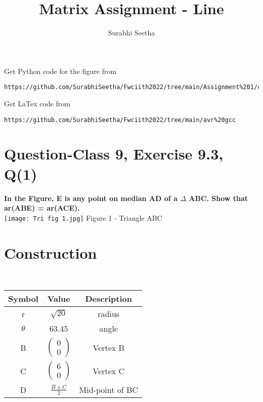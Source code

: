 \documentclass[journal,12pt,twocolumn]{IEEEtran}
\begin{document}
\makeatother
\let\StandardTheFigure\thefigure
\let\vec\mathbf
\renewcommand{\thefigure}{\theproblem}
\def\putbox#1#2#3{\makebox[0in][l]{\makebox[#1][l]{}\raisebox{\baselineskip}[0in][0in]{\raisebox{#2}[0in][0in]{#3}}}}
     \def\rightbox#1{\makebox[0in][r]{#1}}
     \def\centbox#1{\makebox[0in]{#1}}
     \def\topbox#1{\raisebox{-\baselineskip}[0in][0in]{#1}}
     \def\midbox#1{\raisebox{-0.5\baselineskip}[0in][0in]{#1}}
\vspace{3cm}
\title{\textbf{Matrix Assignment - Line} }
\author{Surabhi Seetha}
\maketitle
\newpage
\bigskip
\renewcommand{\thefigure}{\theenumi}
\renewcommand{\thetable}{\theenumi}
Get Python code for the figure from 
\begin{lstlisting}
https://github.com/SurabhiSeetha/Fwciith2022/tree/main/Assignment%201/codes/src
\end{lstlisting}
Get LaTex code from
\begin{lstlisting}
https://github.com/SurabhiSeetha/Fwciith2022/tree/main/avr%20gcc
\end{lstlisting}
%
\section{Question-Class 9, Exercise 9.3, Q(1)}
\textbf{In the Figure, E is any point on median AD of a $\Delta$ ABC. Show that ar(ABE) = ar(ACE).} \\


\centering
\texttt{[image: Tri fig 1.jpg]}
Figure 1 - Triangle ABC

\section{Construction}
\
\centering
\begin{tabular}{|c|c|c|}
\hline
\textbf{Symbol} & \textbf{Value} & \textbf{Description} \\
\hline
r & $\sqrt{20}$ & radius\\
\hline
$\theta$ & 63.45 & angle\\
\hline
B & $\begin{pmatrix} 0 \\ 0 \end{pmatrix}$ & Vertex B\\

\hline
C & $\begin{pmatrix}6 \\0 \end{pmatrix}$ & Vertex C\\
\hline

D & $\frac{B+C}{2}$ & Mid-point of BC\\
 
\hline

\end{tabular}
\end{document}
